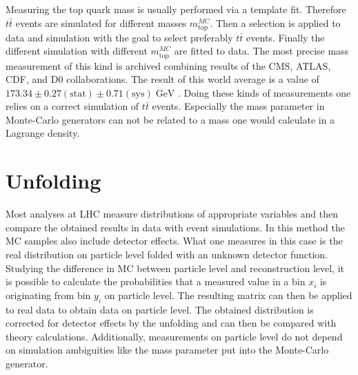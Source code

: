 	
	Measuring the top quark mass is usually performed via a template fit. Therefore $t\bar{t}$ events are simulated for different masses $m_\text{top}^{MC}$. Then a selection is applied to data and simulation with the goal to select preferably $t\bar{t}$ events. Finally the different simulation with different $m_\text{top}^{MC}$ are fitted to data.	The most precise mass measurement of this kind is archived combining results of the CMS, ATLAS, CDF, and D0 collaborations. The result of this world average is a value of $173.34 \pm 0.27 (\text{stat}) \pm 0.71 (\text{sys})\;\text{GeV}$ \cite{topmass_combination}. Doing these kinds of measurements one relies on a correct simulation of $t\bar{t}$ events. Especially the mass parameter in Monte-Carlo generators can not be related to a mass one would calculate in a Lagrange density.
\section{Unfolding}
	Most analyses at LHC measure distributions of appropriate variables and then compare the obtained results in data with event simulations. In this method the MC samples also include detector effects. What one measures in this case is the real distribution on particle level folded with an unknown detector function. Studying the difference in MC between particle level and reconstruction level, it is possible to calculate the probabilities that a measured value in a bin $x_i$ is originating from bin $y_i$ on particle level. The resulting matrix can then be applied to real data to obtain data on particle level. The obtained distribution is corrected for detector effects by the unfolding and can then be compared with theory calculations. Additionally, measurements on particle level do not depend on simulation ambiguities like the mass parameter put into the Monte-Carlo generator.

	